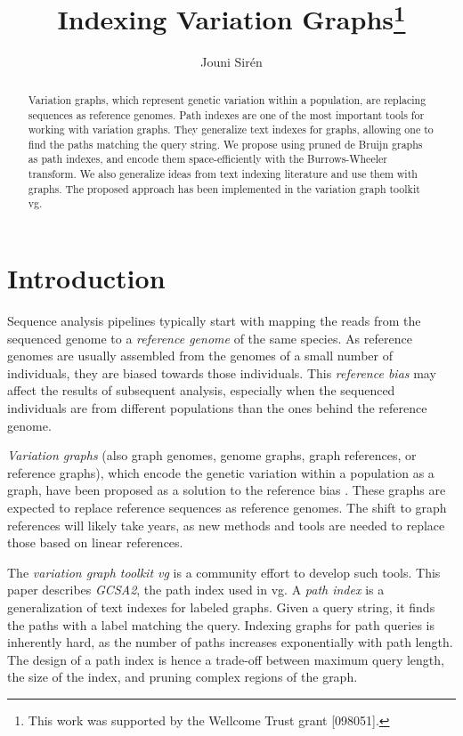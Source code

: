 \documentclass[a4paper,UKenglish]{lipics-v2016}
\title{Indexing Variation Graphs\footnote{This work was supported by the Wellcome Trust grant [098051].}}
\author[1]{Jouni Sirén}
\affil[1]{Wellcome Trust Sanger Institute, Hinxton, Cambridge, UK\\
  \texttt{jouni.siren@iki.fi}}
\begin{document}
\maketitle

\begin{abstract}
Variation graphs, which represent genetic variation within a population, are replacing sequences as reference genomes. Path indexes are one of the most important tools for working with variation graphs. They generalize text indexes for graphs, allowing one to find the paths matching the query string. We propose using pruned de Bruijn graphs as path indexes, and encode them space-efficiently with the Burrows-Wheeler transform. We also generalize ideas from text indexing literature and use them with graphs. The proposed approach has been implemented in the variation graph toolkit vg.
\end{abstract}


\section{Introduction}

Sequence analysis pipelines typically start with mapping the reads from the sequenced genome to a \emph{reference genome} of the same species. As reference genomes are usually assembled from the genomes of a small number of individuals, they are biased towards those individuals. This \emph{reference bias} may affect the results of subsequent analysis, especially when the sequenced individuals are from different populations than the ones behind the reference genome.

\emph{Variation graphs} (also graph genomes, genome graphs, graph references, or reference graphs), which encode the genetic variation within a population as a graph, have been proposed as a solution to the reference bias \cite{Paten2014,Marcus2014,Church2015,Dilthey2015,Marschall2016}. These graphs are expected to replace reference sequences as reference genomes. The shift to graph references will likely take years, as new methods and tools are needed to replace those based on linear references.

The \emph{variation graph toolkit vg} \cite{Garrison2014-2016} is a community effort to develop such tools. This paper describes \emph{GCSA2}, the path index used in vg. A \emph{path index} is a generalization of text indexes for labeled graphs. Given a query string, it finds the paths with a label matching the query. Indexing graphs for path queries is inherently hard, as the number of paths increases exponentially with path length. The design of a path index is hence a trade-off between maximum query length, the size of the index, and pruning complex regions of the graph.
\end{document}
